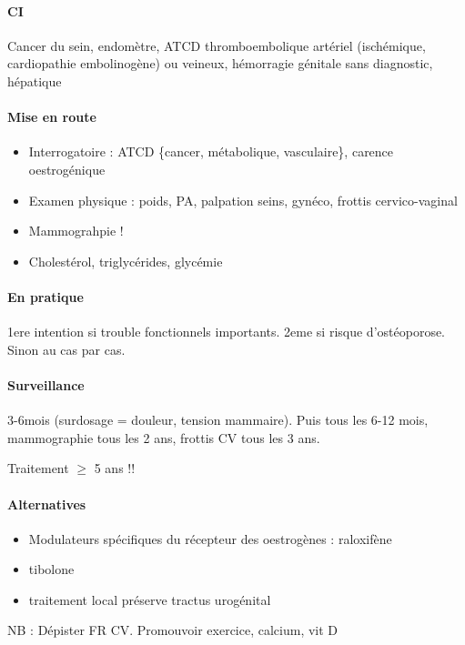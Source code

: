 \documentclass[11pt]{article}
\begin{document}
\paragraph{CI}
\label{sec:orga45bb44}
Cancer du sein, endomètre, ATCD thromboembolique artériel (ischémique,
cardiopathie embolinogène) ou veineux, hémorragie génitale sans diagnostic, hépatique

\paragraph{Mise en route}
\label{sec:org1d5e07f}
\begin{itemize}
\item Interrogatoire : ATCD \{cancer, métabolique, vasculaire\}, carence oestrogénique
\item Examen physique : poids, PA, palpation seins, gynéco, frottis cervico-vaginal
\item Mammograhpie !
\item Cholestérol, triglycérides, glycémie
\end{itemize}

\paragraph{En pratique}
\label{sec:orgef1d082}
1ere intention si trouble fonctionnels importants. 2eme si risque
d'ostéoporose. Sinon au cas par cas.

\paragraph{Surveillance}
\label{sec:org3397b85}
3-6mois (surdosage = douleur, tension mammaire). Puis tous les 6-12 mois,
mammographie tous les 2 ans, frottis CV tous les 3 ans.

Traitement \(\ge\) 5 ans !!

\paragraph{Alternatives}
\label{sec:org796d3dc}
\begin{itemize}
\item Modulateurs spécifiques du récepteur des oestrogènes : raloxifène
\item tibolone
\item traitement local préserve tractus urogénital
\end{itemize}

NB : Dépister FR CV. Promouvoir exercice, calcium, vit D
\end{document}

